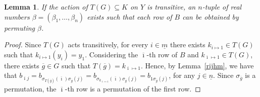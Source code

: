 \documentclass[11pt]{article}
\newtheorem{lemma}[theorem]{Lemma}
\begin{document}
\begin{lemma}\label{lempermutationrow}
If the action of $T(G) \subseteq K$ on $Y$ is transitive, an $n$-tuple of real numbers $\beta=(\beta_1,\ldots,\beta_n)$ exists such that each row of ${B}$ can be obtained by permuting $\beta$.
\end{lemma}
\begin{proof}
Since $T(G)$ acts transitively, for every $i \in \underline{m}$ there exists
$k_{i \mapsto 1}\in T(G)$ such that $k_{i\mapsto1}(y_i)=y_1$.
Considering the $\overline \imath$-th row of $B$ and $k_{\overline \imath \mapsto 1} \in T(G)$, there exists $\overline g \in G$ such that $T(\overline g)=k_{\overline \imath \mapsto 1}$. Hence, by Lemma~\ref{rijhm}, we have that $b_{\overline \imath j}
=b_{\sigma_{T (\overline g)}(\overline \imath) \sigma_{\overline g}(j)}
=b_{\sigma_{k_{\overline\imath \mapsto 1}}(\overline \imath) \sigma_{\overline g}(j)}
=b_{1\sigma_{\overline g}(j)}$, for any $j \in \underline{n}$.
Since $\sigma_{\overline g}$ is a permutation, the $\overline\imath$-th row is a permutation of the first row.
\end{proof}

\end{document}
